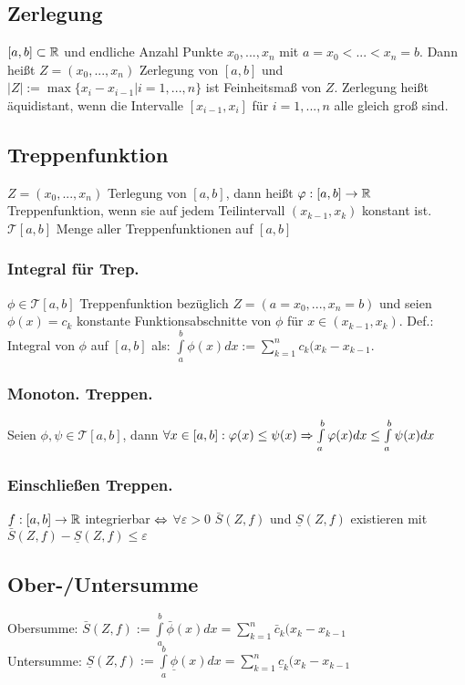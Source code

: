 \subsection*{Zerlegung}
$[a, b]\subset \mathbb R$ und endliche Anzahl Punkte $x_0, ..., x_n$ mit $a = x_0 < ... < x_n = b$. Dann heißt $Z = (x_0, ..., x_n)$ Zerlegung von $[a, b]$ und $|Z| := \max \{x_i - x_{i - 1} | i = 1, ..., n\}$ ist Feinheitsmaß von $Z$. Zerlegung heißt äquidistant, wenn die Intervalle $[x_{i - 1}, x_i]$ für $i = 1, ..., n$ alle gleich groß sind.
\subsection*{Treppenfunktion}
$Z = (x_0, ..., x_n)$ Terlegung von $[a, b]$, dann heißt $\varphi:[a, b]\rightarrow \mathbb R$ Treppenfunktion, wenn sie auf jedem Teilintervall $(x_{k-1}, x_k)$ konstant ist. $\mathcal{T}[a,b]$ Menge aller Treppenfunktionen auf $[a, b]$
\subsubsection*{Integral für Trep.}
$\phi \in \mathcal{T}[a,b]$ Treppenfunktion bezüglich $Z = (a = x_0, ..., x_n = b)$ und seien $\phi(x) = c_k$ konstante Funktionsabschnitte von $\phi$ für $x \in (x_{k-1}, x_k)$. Def.: Integral von $\phi$ auf $[a, b]$ als: $\int\limits_{a}^b \phi(x) dx := \sum\limits_{k = 1}^n c_k (x_k - x_{k - 1}$.
\subsubsection*{Monoton. Treppen.}
Seien $\phi, \psi \in \mathcal{T}[a, b]$, dann $\forall x \in [a, b]: \varphi(x) \leq \psi(x) \Rightarrow \int\limits_{a}^b \varphi(x) dx \leq \int\limits_a^b \psi(x) dx$
\subsubsection*{Einschließen Treppen.}
$f:[a, b] \rightarrow \mathbb R$ integrierbar $\Leftrightarrow$ $\forall \varepsilon > 0$ $\bar S(Z, f)$ und $\underline{S}(Z, f)$ existieren mit $\bar S (Z, f) - \underline{S}(Z, f) \leq \varepsilon$
\subsection*{Ober-/Untersumme}
Obersumme: $\bar S(Z, f) := \int\limits_a^b \bar \phi(x) dx = \sum\limits_{k = 1}^n \bar c_k (x_k - x_{k - 1}$\\
Untersumme: $\underline{S}(Z, f) := \int\limits_a^b \underline{\phi}(x) dx = \sum\limits_{k = 1}^n \underline{c}_k (x_k - x_{k -1}$
